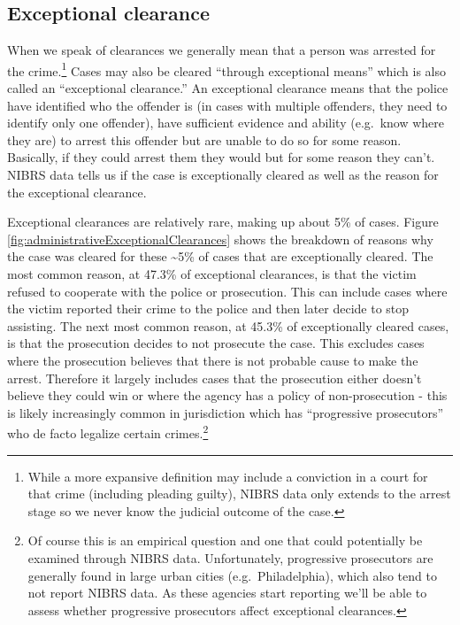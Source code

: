 \documentclass[
  12pt,
  openany]{book}
\begin{document}
\hypertarget{exceptional-clearance}{%
\subsection{Exceptional clearance}\label{exceptional-clearance}}

When we speak of clearances we generally mean that a person was arrested for the crime.\footnote{While a more expansive definition may include a conviction in a court for that crime (including pleading guilty), NIBRS data only extends to the arrest stage so we never know the judicial outcome of the case.} Cases may also be cleared ``through exceptional means'' which is also called an ``exceptional clearance.'' An exceptional clearance means that the police have identified who the offender is (in cases with multiple offenders, they need to identify only one offender), have sufficient evidence and ability (e.g.~know where they are) to arrest this offender but are unable to do so for some reason. Basically, if they could arrest them they would but for some reason they can't. NIBRS data tells us if the case is exceptionally cleared as well as the reason for the exceptional clearance.

Exceptional clearances are relatively rare, making up about 5\% of cases. Figure \ref{fig:administrativeExceptionalClearances} shows the breakdown of reasons why the case was cleared for these \textasciitilde5\% of cases that are exceptionally cleared. The most common reason, at 47.3\% of exceptional clearances, is that the victim refused to cooperate with the police or prosecution. This can include cases where the victim reported their crime to the police and then later decide to stop assisting. The next most common reason, at 45.3\% of exceptionally cleared cases, is that the prosecution decides to not prosecute the case. This excludes cases where the prosecution believes that there is not probable cause to make the arrest. Therefore it largely includes cases that the prosecution either doesn't believe they could win or where the agency has a policy of non-prosecution - this is likely increasingly common in jurisdiction which has ``progressive prosecutors'' who de facto legalize certain crimes.\footnote{Of course this is an empirical question and one that could potentially be examined through NIBRS data. Unfortunately, progressive prosecutors are generally found in large urban cities (e.g.~Philadelphia), which also tend to not report NIBRS data. As these agencies start reporting we'll be able to assess whether progressive prosecutors affect exceptional clearances.}
\end{document}
